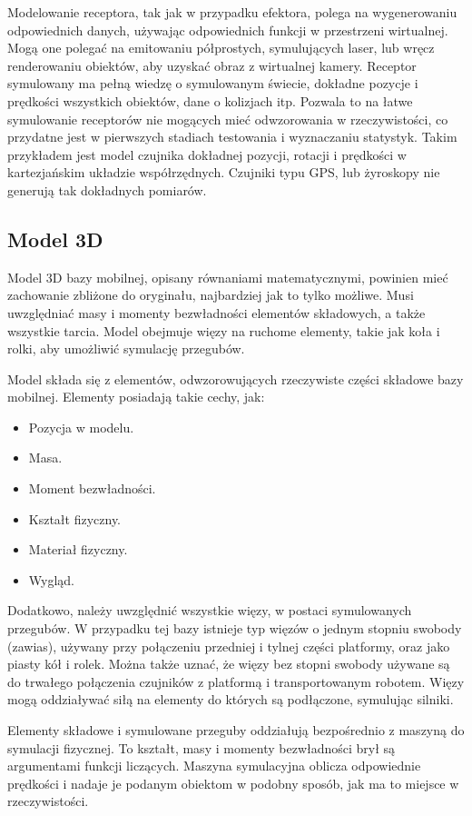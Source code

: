 	Modelowanie receptora, tak jak w przypadku efektora, polega na wygenerowaniu odpowiednich danych, używając odpowiednich funkcji w przestrzeni wirtualnej.
	Mogą one polegać na emitowaniu półprostych, symulujących laser, lub wręcz renderowaniu obiektów, aby uzyskać obraz z wirtualnej kamery.
	Receptor symulowany ma pełną wiedzę o symulowanym świecie, dokładne pozycje i prędkości wszystkich obiektów, dane o kolizjach itp. 
	Pozwala to na łatwe symulowanie receptorów nie mogących mieć odwzorowania w rzeczywistości, co przydatne jest w pierwszych stadiach testowania i wyznaczaniu statystyk.
	Takim przykładem jest model czujnika dokładnej pozycji, rotacji i prędkości w kartezjańskim układzie współrzędnych. 
	Czujniki typu GPS, lub żyroskopy nie generują tak dokładnych pomiarów.

	\subsection{Model 3D}
		Model 3D bazy mobilnej, opisany równaniami matematycznymi, powinien mieć zachowanie zbliżone do oryginału, najbardziej jak to tylko możliwe.
		Musi uwzględniać masy i momenty bezwładności elementów składowych, a także wszystkie tarcia.
		Model obejmuje więzy na ruchome elementy, takie jak koła i rolki, aby umożliwić symulację przegubów.

		Model składa się z elementów, odwzorowujących rzeczywiste części składowe bazy mobilnej.
		Elementy posiadają takie cechy, jak:
		\begin{itemize}
			\item Pozycja w modelu.
			\item Masa.
			\item Moment bezwładności.
			\item Kształt fizyczny.
			\item Materiał fizyczny.
			\item Wygląd.
		\end{itemize}

		Dodatkowo, należy uwzględnić wszystkie więzy, w postaci symulowanych przegubów.
		W przypadku tej bazy istnieje typ więzów o jednym stopniu swobody (zawias), używany przy połączeniu przedniej i tylnej części platformy, oraz 
		jako piasty kół i rolek. Można także uznać, że więzy bez stopni swobody używane są do trwałego połączenia czujników z platformą i transportowanym robotem.
		Więzy mogą oddziaływać siłą na elementy do których są podłączone, symulując silniki.

		Elementy składowe i symulowane przeguby oddziałują bezpośrednio z maszyną do symulacji fizycznej. 
		To kształt, masy i momenty bezwładności brył są argumentami funkcji liczących.
		Maszyna symulacyjna oblicza odpowiednie prędkości i nadaje je podanym obiektom w podobny sposób, jak ma to miejsce w rzeczywistości.

